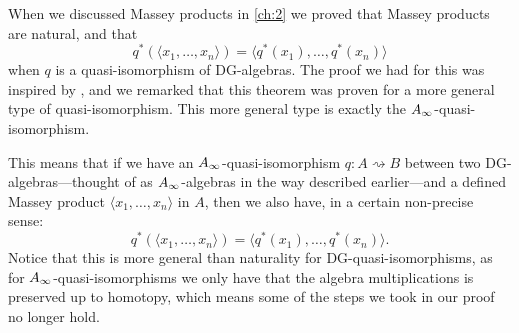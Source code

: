 \begin{remark}
When we discussed Massey products in \cref{ch:2} we proved that Massey products are natural, and that 
\begin{equation*}
	q^*(\langle x_1, \ldots, x_n\rangle ) = \langle q^*(x_1),\ldots, q^*(x_n)\rangle
\end{equation*}
when $q$ is a quasi-isomorphism of DG-algebras. The proof we had for this was inspired by \cite[Theorem 1.5]{naturality}, and we remarked that this theorem was proven for a more general type of quasi-isomorphism. This more general type is exactly the $A_{\infty}$-quasi-isomorphism.

This means that if we have an $A_{\infty}$-quasi-isomorphism $q\colon A\rightsquigarrow B$ between two DG-algebras---thought of as $A_{\infty}$-algebras in the way described earlier---and a defined Massey product $\langle x_1, \ldots, x_n\rangle$ in $A$, then we also have, in a certain non-precise sense:
\begin{equation*}
	q^*(\langle x_1, \ldots, x_n\rangle ) = \langle q^*(x_1),\ldots, q^*(x_n)\rangle .
\end{equation*}
Notice that this is more general than naturality for DG-quasi-isomorphisms, as for $A_{\infty}$-quasi-isomorphisms we only have that the algebra multiplications is preserved up to homotopy, which means some of the steps we took in our proof no longer hold. 
\end{remark}





